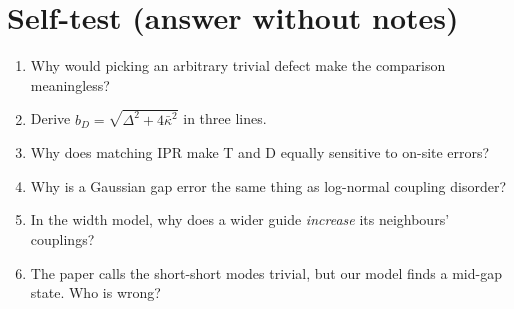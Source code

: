 \documentclass[10pt,a4paper]{article}
\newcommand{\kb}{\bar\kappa}
\begin{document}
\section{Self-test (answer without notes)}
\begin{enumerate}[itemsep=1pt]
\item Why would picking an arbitrary trivial defect make the comparison meaningless?
\item Derive $b_D=\sqrt{\Delta^2+4\kb^2}$ in three lines.
\item Why does matching IPR make T and D equally sensitive to on-site errors?
\item Why is a Gaussian gap error the same thing as log-normal coupling disorder?
\item In the width model, why does a wider guide \emph{increase} its neighbours' couplings?
\item The paper calls the short-short modes trivial, but our model finds a mid-gap state. Who is wrong?
\end{enumerate}
\end{document}
